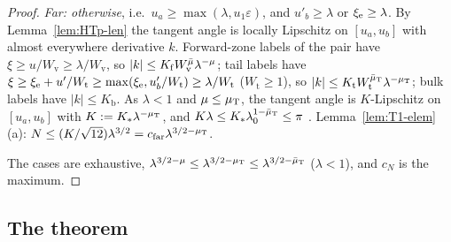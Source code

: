 \begin{proof}
\emph{Far: otherwise}, i.e.\ $u_a\ge\max(\lambda,u_1\varepsilon)$, and $u'_b\ge\lambda$ or $\xi_{\mathrm e}\ge\lambda$. By Lemma~\ref{lem:HTp-len} the
tangent angle is locally Lipschitz on $[u_a,u_b]$ with almost everywhere derivative $k$. Forward-zone labels of the pair have
$\xi\ge u/W_{\mathrm v}\ge\lambda/W_{\mathrm v}$, so $|k|\le K_{\mathrm f}W_{\mathrm v}^{\bar\mu}\lambda^{-\mu}$; tail labels have
$\xi\ge\xi_{\mathrm e}+u'/W_{\mathrm t}\ge\max(\xi_{\mathrm e},u'_b/W_{\mathrm t})\ge\lambda/W_{\mathrm t}$ ($W_{\mathrm t}\ge1$), so
$|k|\le K_{\mathrm t}W_{\mathrm t}^{\bar\mu_{\mathrm T}}\lambda^{-\mu_{\mathrm T}}$; bulk labels have $|k|\le K_{\mathrm b}$. As $\lambda<1$ and $\mu\le\mu_{\mathrm T}$, the tangent
angle is $K$-Lipschitz on $[u_a,u_b]$ with $K:=K_*\lambda^{-\mu_{\mathrm T}}$, and $K\lambda\le K_*\lambda_0^{1-\bar\mu_{\mathrm T}}\le\pi$ .
Lemma~\ref{lem:T1-elem}(a): $N\le(K/\sqrt{12})\lambda^{3/2}=c_{\mathrm{far}}\lambda^{3/2-\mu_{\mathrm T}}$.

The cases are exhaustive, $\lambda^{3/2-\mu}\le\lambda^{3/2-\mu_{\mathrm T}}\le\lambda^{3/2-\bar\mu_{\mathrm T}}$ ($\lambda<1$), and $c_N$ is the maximum.
\end{proof}

\subsection{The theorem}\label{sec:HTp-thm}

